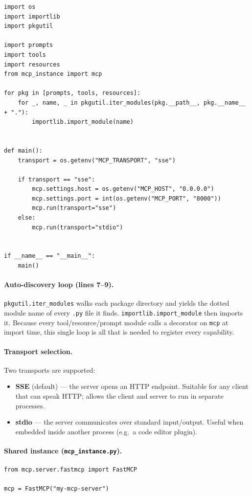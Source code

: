 \documentclass[11pt, a4paper]{article}
\begin{document}
\begin{lstlisting}[caption={server.py}]
import os
import importlib
import pkgutil

import prompts
import tools
import resources
from mcp_instance import mcp

for pkg in [prompts, tools, resources]:
    for _, name, _ in pkgutil.iter_modules(pkg.__path__, pkg.__name__ + "."):
        importlib.import_module(name)


def main():
    transport = os.getenv("MCP_TRANSPORT", "sse")

    if transport == "sse":
        mcp.settings.host = os.getenv("MCP_HOST", "0.0.0.0")
        mcp.settings.port = int(os.getenv("MCP_PORT", "8000"))
        mcp.run(transport="sse")
    else:
        mcp.run(transport="stdio")


if __name__ == "__main__":
    main()
\end{lstlisting}

\paragraph{Auto-discovery loop (lines 7--9).}
\texttt{pkgutil.iter\_modules} walks each package directory and yields the dotted module name of every \texttt{.py} file it finds. \texttt{importlib.import\_module} then imports it. Because every tool/resource/prompt module calls a decorator on \lstinline{mcp} at import time, this single loop is all that is needed to register every capability.

\paragraph{Transport selection.}
Two transports are supported:
\begin{itemize}
  \item \textbf{SSE} (default) — the server opens an HTTP endpoint. Suitable for any client that can speak HTTP; allows the client and server to run in separate processes.
  \item \textbf{stdio} — the server communicates over standard input/output. Useful when embedded inside another process (e.g.\ a code editor plugin).
\end{itemize}

\paragraph{Shared instance (\texttt{mcp\_instance.py}).}
\begin{lstlisting}[caption={mcp\_instance.py}]
from mcp.server.fastmcp import FastMCP

mcp = FastMCP("my-mcp-server")
\end{lstlisting}
\end{document}
